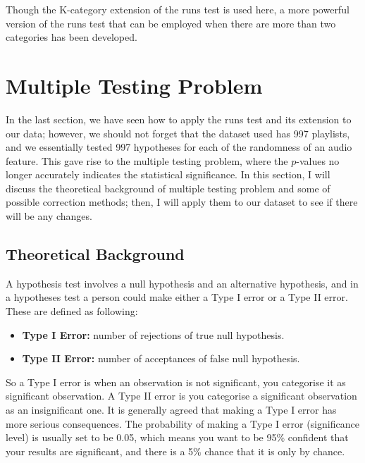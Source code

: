 \documentclass[12pt]{article}
\theoremstyle{plain}
\theoremstyle{definition}
\theoremstyle{remark}
\begin{document}
Though the K-category extension of the runs test is used here, a more powerful version\cite{3.4} of the runs test that can be employed when there are more than two categories has been developed. 





\newpage


\section{Multiple Testing Problem}
In the last section, we have seen how to apply the runs test and its extension to our data; however, we should not forget that the dataset used has 997 playlists, and we essentially tested 997 hypotheses for each of the randomness of an audio feature. This gave rise to the multiple testing problem, where the $p$-values no longer accurately indicates the statistical significance\cite{5.2}. In this section, I will discuss the theoretical background of multiple testing problem and some of possible correction methods; then, I will apply them to our dataset to see if there will be any changes.


\subsection{Theoretical Background}
A hypothesis test involves a null hypothesis and an alternative hypothesis, and in a hypotheses test a person could make either a Type I error or a Type II error. These are defined as following\cite{5.2}:
\begin{itemize}
    \item \textbf{Type I Error:} number of rejections of true null hypothesis.
    \item \textbf{Type II Error:} number of acceptances of false null hypothesis.
\end{itemize}
So a Type I error is when an observation is not significant, you categorise it as significant observation. A Type II error is you categorise a significant observation as an insignificant one. It is generally agreed that making a Type I error has more serious consequences.\cite{5.2} The probability of making a Type I error (significance level) is usually set to be 0.05, which means you want to be 95\% confident that your results are significant, and there is a 5\% chance that it is only by chance.\cite{5.4}
\end{document}
